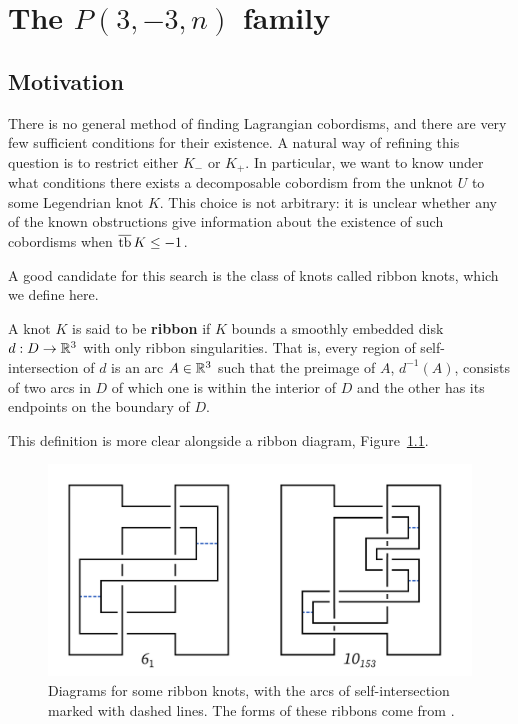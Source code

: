 \chapter{The \texorpdfstring{$P(3, -3, n)$}{P(3, -3, n)} family}\label{ch:pretzel}
\section{Motivation}\label{sec:motivation}
There is no general method of finding Lagrangian cobordisms, and there are very few sufficient conditions for their existence.
A natural way of refining this question is to restrict either $K_-$ or $K_+$.
In particular, we want to know under what conditions there exists a decomposable cobordism from the unknot $U$ to some Legendrian knot $K$. This choice is not arbitrary: it is unclear whether any of the known obstructions give information about the existence of such cobordisms when $\overline{\operatorname{tb}}\, K \leq -1$.

A good candidate for this search is the class of knots called ribbon knots, which we define here.

\begin{definition}
    A knot $K$ is said to be \textbf{ribbon} if $K$ bounds a smoothly embedded disk $d: D \to \mathbb{R}^3$ with only ribbon singularities.
    That is, every region of self-intersection of $d$ is an arc $A \in \mathbb{R}^3$ such that the preimage of $A$, $d^{-1} (A)$, consists of two arcs in $D$ of which one is within the interior of $D$ and the other has its endpoints on the boundary of $D$.
\end{definition}

This definition is more clear alongside a ribbon diagram, Figure~\ref{fig:ribbons}.

\begin{figure}[ht!]
    \centering
    \includegraphics[width=0.6\linewidth]{images/ribbons.pdf}
    \caption{Diagrams for some ribbon knots, with the arcs of self-intersection marked with dashed lines. The forms of these ribbons come from \cite{kawauchi}.}
    \label{fig:ribbons}
\end{figure}

